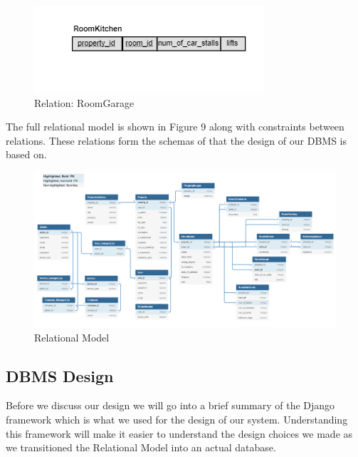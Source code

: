 \documentclass[12pt,a4paper]{report}
\begin{document}
\begin{itemize}
\begin{figure}[H]
\centering
\includegraphics[scale=1.5]{rmgrg.png}
\caption{Relation: RoomGarage}
\label{Figure:rmgrg}
\end{figure}

\end{itemize}

The full relational model is shown in Figure 9 along with constraints between relations. These relations form the schemas of that the design of our DBMS is based on.
\begin{figure}[H]
\centering
\includegraphics[scale=0.5]{RelationalModel.png}
\caption{Relational Model}
\label{Figure:RM}
\end{figure} 

\subsection{DBMS Design}
Before we discuss our design we will go into a brief summary of the Django framework which is what we used for the design of our system. Understanding this framework will make it easier to understand the design choices we made as we transitioned the Relational Model into an actual database. \par 
\end{document}
